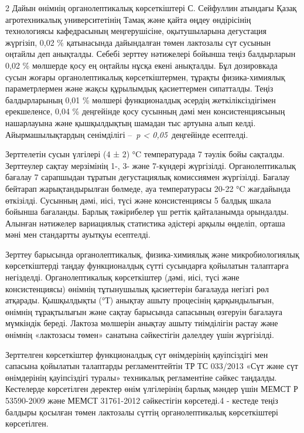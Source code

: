 \begin{multicols}{2}
Дайын өнімнің органолептикалық көрсеткіштері С. Сейфуллин атындағы Қазақ
агротехникалық университетінің Тамақ және қайта өңдеу өндірісінің
технологиясы кафедрасының меңгерушісіне, оқытушыларына дегустация
жүргізіп, 0,02 \% қатынасында дайындалған төмен лактозалы сүт сусынын
оңтайлы деп анықталды. Себебі зерттеу нәтижелері бойынша теңіз
балдырларын 0,02 \% мөлшерде қосу ең оңтайлы нұсқа екені анықталды. Бұл
дозировкада сусын жоғары органолептикалық көрсеткіштермен, тұрақты
физика-химиялық параметрлермен және жақсы құрылымдық қасиеттермен
сипатталды. Теңіз балдырларының 0,01 \% мөлшері функционалдық әсердің
жеткіліксіздігімен ерекшеленсе, 0,04 \% деңгейінде қосу сусынның дәмі
мен консистенциясының нашарлауына және қышқылдықтың шамадан тыс артуына
алып келді. Айырмашылықтардың сенімділігі --~\emph{p <{}
0,05}~деңгейінде есептелді.

Зерттелетін сусын үлгілері (4 ± 2) °C температурада 7 тәулік бойы
сақталды. Зерттеулер сақтау мерзімінің 1-, 3- және 7-күндері жүргізілді.
Органолептикалық бағалау 7 сарапшыдан тұратын дегустациялық комиссиямен
жүргізілді. Бағалау бейтарап жарықтандырылған бөлмеде, ауа температурасы
20-22 °C жағдайында өткізілді. Сусынның дәмі, иісі, түсі және
консистенциясы 5 балдық шкала бойынша бағаланды. Барлық тәжірибелер үш
реттік қайталанымда орындалды. Алынған нәтижелер вариациялық статистика
әдістері арқылы өңделіп, орташа мәні мен стандартты ауытқуы есептелді.

Зерттеу барысында органолептикалық, физика-химиялық және
микробиологиялық көрсеткіштерді таңдау функционалдық сүтті сусындарға
қойылатын талаптарға негізделді. Органолептикалық көрсеткіштер (дәмі,
иісі, түсі және консистенциясы) өнімнің тұтынушылық қасиеттерін
бағалауда негізгі рөл атқарады. Қышқылдықты (°Т) анықтау ашыту
процесінің қарқындылығын, өнімнің тұрақтылығын және сақтау барысында
сапасының өзгеруін бағалауға мүмкіндік береді. Лактоза мөлшерін анықтау
ашыту тиімділігін растау және өнімнің «лактозасы төмен» санатына
сәйкестігін дәлелдеу үшін жүргізілді.

Зерттелген көрсеткіштер функционалдық сүт өнімдерінің қауіпсіздігі мен
сапасына қойылатын талаптарды регламенттейтін ТР ТС 033/2013 «Сүт және
сүт өнімдерінің қауіпсіздігі туралы» техникалық регламентіне сәйкес
таңдалды. Кестелерде көрсетілген деректер өнім үлгілерінің барлық мәндер
үшін МЕМСТ Р 53590-2009 және МЕМСТ 31761-2012 сәйкестігін көрсетеді.4 -
кестеде теңіз балдыры қосылған төмен лактозалы сүттің органолептикалық
көрсеткіштері көрсетілген.
\end{multicols}

